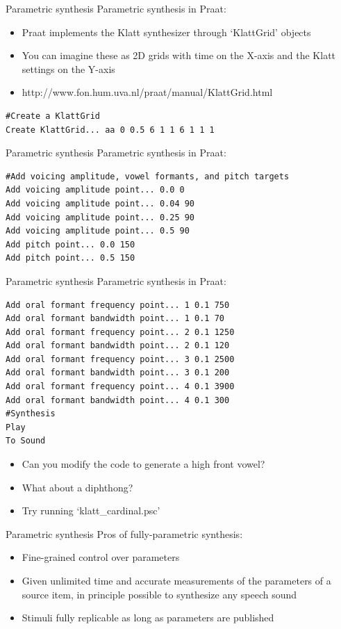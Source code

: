 \documentclass{beamer}
\begin{document}
\begin{frame}[fragile]{Parametric synthesis}
Parametric synthesis in Praat:
\begin{itemize}
\item{Praat implements the Klatt synthesizer through `KlattGrid' objects}
\item{You can imagine these as 2D grids with time on the X-axis and the Klatt settings on the Y-axis}
\item{http://www.fon.hum.uva.nl/praat/manual/KlattGrid.html}
\end{itemize}
\begin{lstlisting}
#Create a KlattGrid
Create KlattGrid... aa 0 0.5 6 1 1 6 1 1 1
\end{lstlisting}
\end{frame}
\begin{frame}[fragile]{Parametric synthesis}
Parametric synthesis in Praat:
\begin{lstlisting}
#Add voicing amplitude, vowel formants, and pitch targets
Add voicing amplitude point... 0.0 0
Add voicing amplitude point... 0.04 90
Add voicing amplitude point... 0.25 90
Add voicing amplitude point... 0.5 90
Add pitch point... 0.0 150
Add pitch point... 0.5 150
\end{lstlisting}
\end{frame}
\begin{frame}[fragile]{Parametric synthesis}
Parametric synthesis in Praat:
\begin{lstlisting}
Add oral formant frequency point... 1 0.1 750
Add oral formant bandwidth point... 1 0.1 70
Add oral formant frequency point... 2 0.1 1250
Add oral formant bandwidth point... 2 0.1 120
Add oral formant frequency point... 3 0.1 2500
Add oral formant bandwidth point... 3 0.1 200
Add oral formant frequency point... 4 0.1 3900
Add oral formant bandwidth point... 4 0.1 300
#Synthesis
Play
To Sound
\end{lstlisting}
\begin{itemize}
\item{Can you modify the code to generate a high front vowel?}
\item{What about a diphthong?}
\item{Try running `klatt\_cardinal.psc'}
\end{itemize}
\end{frame}
\begin{frame}{Parametric synthesis}
Pros of fully-parametric synthesis:
\begin{itemize}
\item{Fine-grained control over parameters}
\item{Given unlimited time and accurate measurements of the parameters of a source item, in principle possible to synthesize any speech sound}
\item{Stimuli fully replicable as long as parameters are published}
\end{itemize}
\end{frame}
\end{document}
